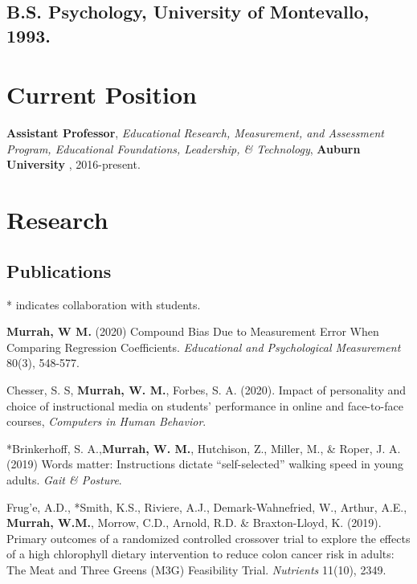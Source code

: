 \documentclass[11pt,]{article}
\providecommand{\tightlist}{%
  \setlength{\itemsep}{0pt}\setlength{\parskip}{0pt}}
\renewenvironment{itemize}{
  \begin{list}{}{
    \setlength{\leftmargin}{1.5em}
  }
}{
  \end{list}
}
\begin{document}
\hypertarget{b.s.-psychology-university-of-montevallo-1993.}{%
\subsection{B.S. Psychology, University of Montevallo,
1993.}\label{b.s.-psychology-university-of-montevallo-1993.}}

\hypertarget{current-position}{%
\section{Current Position}\label{current-position}}

\begin{itemize}
\tightlist
\item
  \textbf{Assistant Professor}, \emph{Educational Research, Measurement,
  and Assessment Program, Educational Foundations, Leadership, \&
  Technology}, \textbf{Auburn University} , 2016-present.
\end{itemize}

\hypertarget{research}{%
\section{Research}\label{research}}

\hypertarget{publications}{%
\subsection{Publications}\label{publications}}

* indicates collaboration with students.

\textbf{Murrah, W M.} (2020) Compound Bias Due to Measurement Error When
Comparing Regression Coefficients. \emph{Educational and Psychological
Measurement} 80(3), 548-577.

Chesser, S. S, \textbf{Murrah, W. M.}, Forbes, S. A. (2020). Impact of
personality and choice of instructional media on students' performance
in online and face-to-face courses, \emph{Computers in Human Behavior}.

*Brinkerhoff, S. A.,\textbf{Murrah, W. M.}, Hutchison, Z., Miller, M.,
\& Roper, J. A. (2019) Words matter: Instructions dictate
``self-selected'' walking speed in young adults. \emph{Gait \& Posture}.

Frug'e, A.D., *Smith, K.S., Riviere, A.J., Demark-Wahnefried, W.,
Arthur, A.E., \textbf{Murrah, W.M.}, Morrow, C.D., Arnold, R.D. \&
Braxton-Lloyd, K. (2019). Primary outcomes of a randomized controlled
crossover trial to explore the effects of a high chlorophyll dietary
intervention to reduce colon cancer risk in adults: The Meat and Three
Greens (M3G) Feasibility Trial. \emph{Nutrients} 11(10), 2349.
\end{document}
